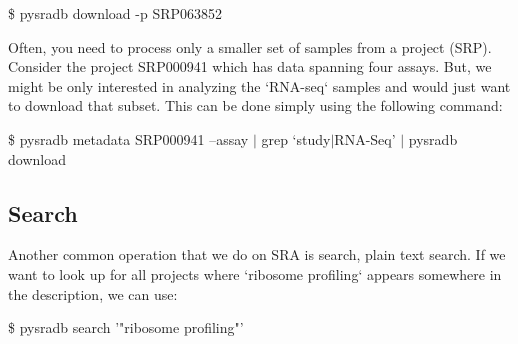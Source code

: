 \documentclass[9pt,a4paper]{extarticle}
\newenvironment{allintypewriter}{\ttfamily}{\par}
\begin{document}
\begin{allintypewriter}
\$ pysradb download -p SRP063852 
\end{allintypewriter}

Often, you need to process only a smaller set of samples from a project (SRP).
Consider the project SRP000941 which has data spanning four assays. But, we might be 
only interested in analyzing the `RNA-seq` samples and would just want to download
that subset. This can be done simply using the following command:



\begin{allintypewriter}
\$ pysradb metadata SRP000941 --assay $|$ grep `study$|$RNA-Seq' $|$ pysradb download
\end{allintypewriter}

\subsection*{Search}

Another common operation that we do on SRA is search, plain text search. If we want
to look up for all projects where `ribosome profiling` appears somewhere
in the description, we can use:

\begin{allintypewriter}
\$ pysradb search '"ribosome profiling"'
\end{allintypewriter}
\end{document}
